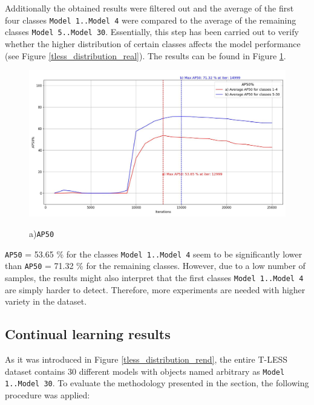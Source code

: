 \documentclass[english, 12pt, a4paper, elec, utf8, a-1b, online]{aaltothesis}
\begin{document}
Additionally the obtained results were filtered out and the average of the first four classes \texttt{Model 1..Model 4} were compared to the average of the remaining classes \texttt{Model 5..Model 30}. Essentially, this step has been carried out to verify whether the higher distribution of certain classes affects the model performance (see Figure \ref{tless_distribution_real}). The results can be found in Figure \ref{myModel_withOrigSched_grouped}.     
\begin{figure}[htb]
	\begin{center}
	\includegraphics[width=14cm]{./AP50_per_class_group.jpg}
	\end{center}
	\caption{a)\texttt{AP50}}
	\begin{center}
	\label{myModel_withOrigSched_grouped}
	\end{center}
\end{figure}
\FloatBarrier 

\texttt{AP50} = 53.65 \% for the classes \texttt{Model 1..Model 4} seem to be significantly lower than \texttt{AP50} = 71.32 \% for the remaining classes. However, due to a low number of samples, the results might also interpret that the first classes \texttt{Model 1..Model 4} are simply harder to detect. Therefore, more experiments are needed with higher variety in the dataset.  


\subsection{Continual learning results}
\label{cont_learning_results} 
As it was introduced in Figure \ref{tless_distribution_rend}, the entire T-LESS dataset contains 30 different models with objects named arbitrary as \texttt{Model 1..Model 30}. To evaluate the methodology presented in the  section, the following procedure was applied:
 
\end{document}
